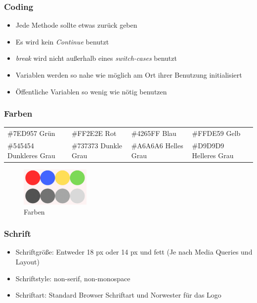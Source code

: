 \documentclass[11pt]{article}
\begin{document}
\subsubsection{Coding}
\begin{itemize}
\item Jede Methode sollte etwas zurück geben
\item Es wird kein \textit{Continue} benutzt
\item \textit{break} wird nicht außerhalb eines \textit{switch-cases} benutzt
\item Variablen werden so nahe wie möglich am Ort ihrer Benutzung initialisiert
\item Öffentliche Variablen so wenig wie nötig benutzen
\end{itemize}

\subsubsection{Farben}

\begin{tabular}{llll}
\#7ED957    Grün & \#FF2E2E    Rot & \#4265FF    Blau & \#FFDE59    Gelb \\
\#545454    Dunkleres Grau & \#737373    Dunkle Grau & \#A6A6A6    Helles Grau & \#D9D9D9    Helleres Grau\\
\end{tabular}

\begin{figure}[ht]
\centering
\includegraphics[width=0.3\textwidth]{images/colors.png}
\caption{\label{fig:colors}Farben}
\end{figure}

\subsubsection{Schrift}
\begin{itemize}
\item Schriftgröße: Entweder 18 px oder 14 px und fett (Je nach Media Queries und Layout)
\item Schriftstyle: non-serif, non-monospace
\item Schriftart: Standard Browser Schriftart und Norwester für das Logo
\end{itemize}
\end{document}
